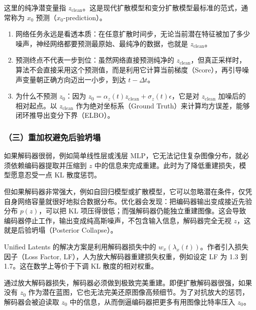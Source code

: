 这里的纯净潜变量指 \(z_{\mathrm{clean}}\)。这是现代扩散模型和变分扩散模型最标准的范式，通常称为 \(x_0\) 预测（\(x_0\)-prediction）。

\begin{enumerate}
\def\labelenumi{\arabic{enumi}.}
\tightlist
\item
  网络任务永远是看透本质：在任意扩散时间步，无论当前潜在特征被加了多少噪声，神经网络都要预测最原始、最纯净的数据，也就是 \(z_{\mathrm{clean}}\)。
\item
  预测终点不代表一步到位：虽然网络直接预测纯净的 \(z_{\mathrm{clean}}\)，但真正采样时，算法不会直接采用这个预测值，而是利用它计算当前梯度（Score），再引导噪声变量朝正确方向迈出一小步，到达 \(t-\Delta t\)。
\item
  为什么不预测 \(z_0\)：因为 \(z_0=\alpha_z(t)z_{\mathrm{clean}}+\sigma_z(t)\epsilon\)，它是对 \(z_{\mathrm{clean}}\) 加噪后的相对起点。以 \(z_{\mathrm{clean}}\) 作为绝对坐标系（Ground Truth）来计算均方误差，能够闭环推导出变分下界（ELBO）。
\end{enumerate}

\hypertarget{ux4e09ux91cdux52a0ux6743ux907fux514dux540eux9a8cux574dux584c}{%
\subsubsection{（三）重加权避免后验坍塌}\label{ux4e09ux91cdux52a0ux6743ux907fux514dux540eux9a8cux574dux584c}}

如果解码器很弱，例如简单线性层或浅层 MLP，它无法记住复杂图像分布，就必须依赖编码器提取并压缩到 \(z\) 中的信息来完成重建。此时为了降低重建损失，模型愿意忍受一点 KL 散度惩罚。

但如果解码器非常强大，例如自回归模型或扩散模型，它可以忽略潜在条件，仅凭自身网络容量就很好地拟合数据分布。优化器会发现：把编码器输出变成接近先验分布 \(p(z)\)，可以把 KL 项压得很低；而强解码器仍能独立重建图像。这会导致编码器停止工作，输出变成纯高斯噪声，不包含输入信息，解码器完全无视 \(z\)，这就是后验坍塌（Posterior Collapse）。

Unified Latents 的解决方案是利用解码器损失中的 \(w_x(\lambda_x(t))\)。作者引入损失因子（Loss Factor, LF），人为放大解码器重建损失权重，例如设定 LF 为 1.3 到 1.7。这在数学上等价于下调 KL 散度的相对权重。

通过放大解码器损失，解码器必须做到极致完美重建。即便扩散解码器很强，如果没有 \(z_0\) 作为潜在蓝图，它也无法完美还原图像高频细节。为了对抗放大的惩罚，解码器会被迫读取 \(z_0\) 中的信息，从而倒逼编码器把更多有用图像比特率压入 \(z_0\)。

